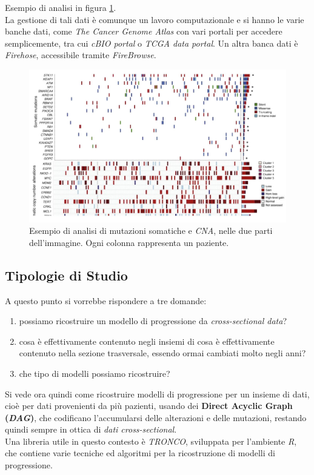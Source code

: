 \documentclass[a4paper,12pt, oneside]{book}
\begin{document}
Esempio di analisi in figura \ref{fig:csd}.\\
La gestione di tali dati è comunque un lavoro computazionale e
si hanno le varie banche dati, come \textit{The Cancer Genome Atlas} con vari
portali per accedere semplicemente, tra cui \textit{cBIO portal} o \textit{TCGA
  data portal}. Un altra banca dati è \textit{Firehose}, accessibile tramite
\textit{FireBrowse}. 
\begin{figure}
  \centering
  \includegraphics[scale = 0.23]{img/csd.jpg}
  \caption{Esempio di analisi di mutazioni somatiche e \textit{CNA}, nelle due
    parti dell'immagine. Ogni colonna rappresenta un paziente. } 
  \label{fig:csd}
\end{figure}
\subsection{Tipologie di Studio}
A questo punto si vorrebbe rispondere a tre domande:
\begin{enumerate}
  \item possiamo ricostruire un modello di progressione da
  \textit{cross-sectional data}?
  \item cosa è effettivamente contenuto negli insiemi di cosa è effettivamente
  contenuto nella sezione trasversale, essendo ormai cambiati molto negli anni?
  \item che tipo di modelli possiamo ricostruire?
\end{enumerate}
Si vede ora quindi come ricostruire modelli di progressione  per un insieme di
dati, cioè per dati provenienti da più pazienti, usando dei \textbf{Direct
  Acyclic Graph (\textit{DAG})}, che codificano l'accumularsi delle alterazioni
e delle mutazioni, restando quindi sempre in ottica di \textit{dati
  cross-sectional}. \\ 
Una libreria utile in questo contesto è \textit{TRONCO}, sviluppata per
l'ambiente \textit{R}, che contiene varie tecniche ed algoritmi per la
ricostruzione di modelli di progressione.
\end{document}
